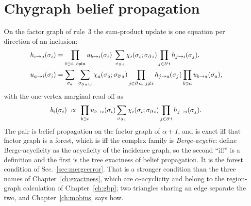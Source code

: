 \section{Chygraph belief propagation}
\label{sec:ce-bp}

On the factor graph of rule~3 the sum-product update is one equation per
direction of an inclusion:
\begin{align}
  h_{i\to a}(\sigma_{i}) &=
    \prod_{b\ni i,\; b\ne a} u_{b\to i}(\sigma_{i})\;
    \sum_{\sigma_{\operatorname{\partial} i}} \chi_{i}(\sigma_{i};\sigma_{\operatorname{\partial} i})
    \prod_{j\in\operatorname{\partial} i} h_{j\to i}(\sigma_{j}),
  \label{eq:chyup}\\
  u_{a\to i}(\sigma_{i}) &=
    \sum_{\sigma_{a}}\ \sum_{\sigma_{\operatorname{\partial} a\setminus i}}
    \chi_{a}(\sigma_{a};\sigma_{\operatorname{\partial} a})
    \prod_{j\in\operatorname{\partial} a,\; j\ne i} h_{j\to a}(\sigma_{j})
    \prod_{b\ni a} u_{b\to a}(\sigma_{a}),
  \label{eq:chydown}
\end{align}
with the one-vertex marginal read off as
\begin{equation}
  b_{i}(\sigma_{i})\ \propto\ \prod_{b\ni i} u_{b\to i}(\sigma_{i})
  \sum_{\sigma_{\operatorname{\partial} i}}\chi_{i}(\sigma_{i};\sigma_{\operatorname{\partial} i})
  \prod_{j\in\operatorname{\partial} i} h_{j\to i}(\sigma_{j}).
  \label{eq:chyread}
\end{equation}
The pair is belief propagation on the factor graph of $\alpha+I$, and is
exact iff that factor graph is a forest, which is iff the complex family is
\emph{Berge-acyclic}: \citet{fagin1983} define Berge-acyclicity as the
acyclicity of the incidence graph, so the second ``iff'' is a definition
and the first is the tree exactness of belief propagation. It is the
forest condition of Sec.~\ref{sec:mergeerror}. That is a stronger condition than the three names of
Chapter~\ref{ch:exactness}, which are $\alpha$-acyclicity and belong to
the region-graph calculation of Chapter~\ref{ch:gbp}; two triangles
sharing an edge separate the two, and Chapter~\ref{ch:mobius} says how.

